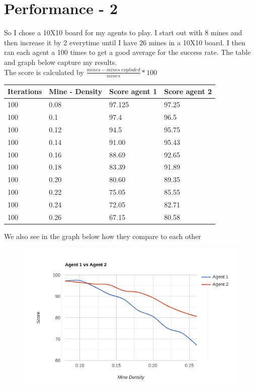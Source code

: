 \documentclass[11pt]{scrartcl} %
\begin{document}
\section{Performance - 2}
So I chose a 10X10 board for my agents to play. I start out with 8 mines and then increase it by 2 everytime until I have 26 mines in a 10X10 board. I then ran each agent a 100 times to get a good average for the success rate. The table and graph below capture my results.\\
The score is calculated by $\frac{mines - mines\ exploded}{mines} * 100$
\begin{table}[H]
\begin{tabular}{|l|l|l|l|}
\hline
Iterations & Mine - Density & Score agent 1 & Score agent 2 \\ \hline
100        & 0.08           & 97.125        & 97.25         \\ \hline
100        & 0.1            & 97.4          & 96.5          \\ \hline
100        & 0.12           & 94.5          & 95.75         \\ \hline
100        & 0.14           & 91.00         & 95.43         \\ \hline
100        & 0.16           & 88.69         & 92.65         \\ \hline
100        & 0.18           & 83.39         & 91.89         \\ \hline
100        & 0.20           & 80.60         & 89.35         \\ \hline
100        & 0.22           & 75.05         & 85.55         \\ \hline
100        & 0.24           & 72.05         & 82.71         \\ \hline
100        & 0.26           & 67.15         & 80.58         \\ \hline
\end{tabular}
\end{table}
We also see in the graph below how they compare to each other
\begin{figure}[H]
\begin{center}
\includegraphics[scale=.75]{Figures/line-graph.png}
\end{center}
\end{figure}
\end{document}
